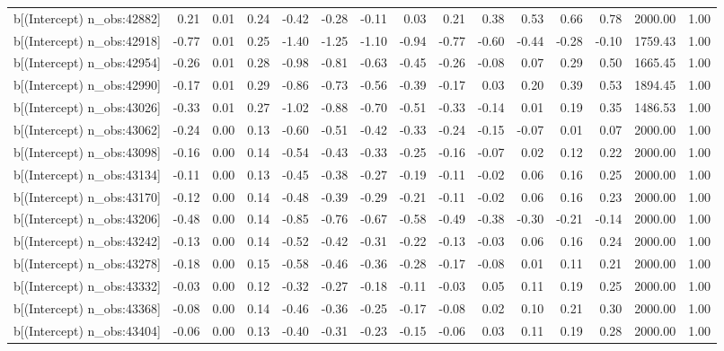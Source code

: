 \begin{table}[ht]
\begin{tabular}{rrrrrrrrrrrrrrr}
  b[(Intercept) n\_obs:42882] & 0.21 & 0.01 & 0.24 & -0.42 & -0.28 & -0.11 & 0.03 & 0.21 & 0.38 & 0.53 & 0.66 & 0.78 & 2000.00 & 1.00 \\ 
  b[(Intercept) n\_obs:42918] & -0.77 & 0.01 & 0.25 & -1.40 & -1.25 & -1.10 & -0.94 & -0.77 & -0.60 & -0.44 & -0.28 & -0.10 & 1759.43 & 1.00 \\ 
  b[(Intercept) n\_obs:42954] & -0.26 & 0.01 & 0.28 & -0.98 & -0.81 & -0.63 & -0.45 & -0.26 & -0.08 & 0.07 & 0.29 & 0.50 & 1665.45 & 1.00 \\ 
  b[(Intercept) n\_obs:42990] & -0.17 & 0.01 & 0.29 & -0.86 & -0.73 & -0.56 & -0.39 & -0.17 & 0.03 & 0.20 & 0.39 & 0.53 & 1894.45 & 1.00 \\ 
  b[(Intercept) n\_obs:43026] & -0.33 & 0.01 & 0.27 & -1.02 & -0.88 & -0.70 & -0.51 & -0.33 & -0.14 & 0.01 & 0.19 & 0.35 & 1486.53 & 1.00 \\ 
  b[(Intercept) n\_obs:43062] & -0.24 & 0.00 & 0.13 & -0.60 & -0.51 & -0.42 & -0.33 & -0.24 & -0.15 & -0.07 & 0.01 & 0.07 & 2000.00 & 1.00 \\ 
  b[(Intercept) n\_obs:43098] & -0.16 & 0.00 & 0.14 & -0.54 & -0.43 & -0.33 & -0.25 & -0.16 & -0.07 & 0.02 & 0.12 & 0.22 & 2000.00 & 1.00 \\ 
  b[(Intercept) n\_obs:43134] & -0.11 & 0.00 & 0.13 & -0.45 & -0.38 & -0.27 & -0.19 & -0.11 & -0.02 & 0.06 & 0.16 & 0.25 & 2000.00 & 1.00 \\ 
  b[(Intercept) n\_obs:43170] & -0.12 & 0.00 & 0.14 & -0.48 & -0.39 & -0.29 & -0.21 & -0.11 & -0.02 & 0.06 & 0.16 & 0.23 & 2000.00 & 1.00 \\ 
  b[(Intercept) n\_obs:43206] & -0.48 & 0.00 & 0.14 & -0.85 & -0.76 & -0.67 & -0.58 & -0.49 & -0.38 & -0.30 & -0.21 & -0.14 & 2000.00 & 1.00 \\ 
  b[(Intercept) n\_obs:43242] & -0.13 & 0.00 & 0.14 & -0.52 & -0.42 & -0.31 & -0.22 & -0.13 & -0.03 & 0.06 & 0.16 & 0.24 & 2000.00 & 1.00 \\ 
  b[(Intercept) n\_obs:43278] & -0.18 & 0.00 & 0.15 & -0.58 & -0.46 & -0.36 & -0.28 & -0.17 & -0.08 & 0.01 & 0.11 & 0.21 & 2000.00 & 1.00 \\ 
  b[(Intercept) n\_obs:43332] & -0.03 & 0.00 & 0.12 & -0.32 & -0.27 & -0.18 & -0.11 & -0.03 & 0.05 & 0.11 & 0.19 & 0.25 & 2000.00 & 1.00 \\ 
  b[(Intercept) n\_obs:43368] & -0.08 & 0.00 & 0.14 & -0.46 & -0.36 & -0.25 & -0.17 & -0.08 & 0.02 & 0.10 & 0.21 & 0.30 & 2000.00 & 1.00 \\ 
  b[(Intercept) n\_obs:43404] & -0.06 & 0.00 & 0.13 & -0.40 & -0.31 & -0.23 & -0.15 & -0.06 & 0.03 & 0.11 & 0.19 & 0.28 & 2000.00 & 1.00 \\ 

\end{tabular}
\end{table}
